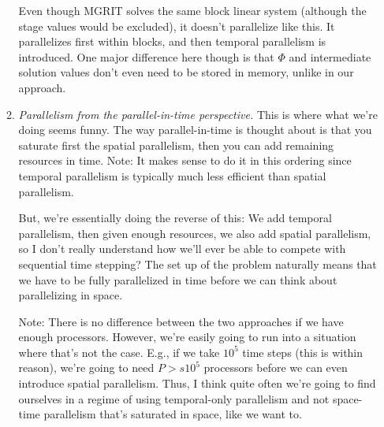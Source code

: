 \documentclass[a4paper,10pt]{article}
\begin{document}
\begin{itemize}
\begin{enumerate}
Even though MGRIT solves the same block linear system (although the stage values would be excluded), it doesn't parallelize like this. It parallelizes first within blocks, and then temporal parallelism is introduced. One major difference here though is that $\Phi$ and intermediate solution values don't even need to be stored in memory, unlike in our approach. 
\item \textit{Parallelism from the parallel-in-time perspective.} This is where what we're doing seems funny. The way parallel-in-time is thought about is that you saturate first the spatial parallelism, then you can add remaining resources in time. Note: It makes sense to do it in this ordering since temporal parallelism is typically much less efficient than spatial parallelism. 

But, we're essentially doing the reverse of this: We add temporal parallelism, then given enough resources, we also add spatial parallelism, so I don't really understand how we'll ever be able to compete with sequential time stepping? The set up of the problem naturally means that we have to be fully parallelized in time before we can think about parallelizing in space.

Note: There is no difference between the two approaches if we have enough processors. However, we're easily going to run into a situation where that's not the case. E.g., if we take $10^5$ time steps (this is within reason), we're going to need $P > s 10^5$ processors before we can even introduce spatial parallelism. Thus, I think quite often we're going to find ourselves in a regime of using temporal-only parallelism and not space-time parallelism that's saturated in space, like we want to. 
\end{enumerate}


\end{itemize}
\end{document}
